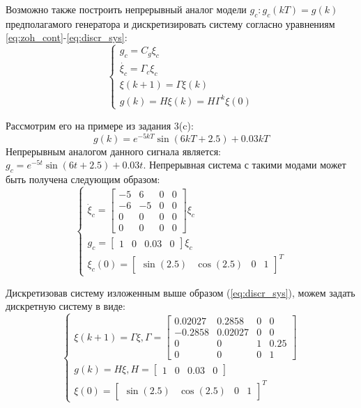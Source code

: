 \documentclass[a4paper, 14pt]{extarticle}
\theoremstyle{definition}
\theoremstyle{plain}
\theoremstyle{remark}
\begin{document}
Возможно также построить непрерывный аналог модели $g_c: g_{c}(kT) = g(k)$ предполагамого генератора и дискретизировать систему согласно уравнениям \ref{eq:zoh_cont}-\ref{eq:discr_sys}:
\begin{equation}
	\begin{cases}
		g_c = C_g \xi_c \\
		\dot{\xi_c} = \Gamma_c\xi_c\\
		\xi(k+1) = \Gamma \xi(k) \\
		g(k) = H\xi(k) = H\Gamma^k\xi(0)
	\end{cases}
\end{equation}

Рассмотрим его на примере из задания 3(c):
\begin{equation}
	g(k) = e^{-5kT}\sin(6kT+2.5) + 0.03kT
\end{equation}
Непрерывным аналогом данного сигнала является: $g_c=e^{-5t}\sin(6t+2.5) + 0.03t$. Непрерывная система с такими модами может быть получена следующим образом:
\begin{equation}
	\begin{cases}
		\dot{\xi}_c = \begin{bmatrix}
			-5 & 6 & 0 & 0 \\ -6 & -5 & 0 & 0 \\ 0 & 0 & 0 & 0 \\ 0 & 0 & 0 & 0
		\end{bmatrix}\xi_c \\
		g_c = \begin{bmatrix}
			1 & 0 & 0.03 & 0
		\end{bmatrix}\xi_c\\
		\xi_c(0) = \begin{bmatrix}
			\sin(2.5) & \cos(2.5) & 0 & 1
		\end{bmatrix}^T
	\end{cases}
\end{equation}

Дискретизовав систему изложенным выше образом (\ref{eq:discr_sys}), можем задать дискретную систему в виде:
\begin{equation} \label{eq:gen2_sys}
	\begin{cases}
		\xi(k+1) = \Gamma\xi, \Gamma=\begin{bmatrix}
			0.02027 & 0.2858 & 0 & 0 \\ -0.2858 & 0.02027 & 0 & 0 \\ 0 & 0 & 1 & 0.25 \\ 0 & 0 & 0 & 1
		\end{bmatrix} \\
		g(k) = H\xi, H = \begin{bmatrix}
			1 & 0 & 0.03 & 0
		\end{bmatrix} \\
		\xi(0) = \begin{bmatrix}
			\sin(2.5) & \cos(2.5) & 0 & 1
		\end{bmatrix}^T
	\end{cases}
\end{equation}
\end{document}
